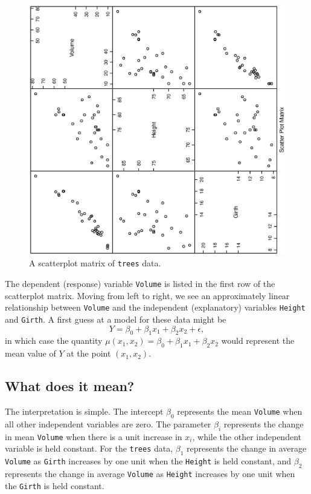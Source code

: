 \documentclass[captions=tableheading]{scrbook}
\begin{document}
\begin{example}
\begin{figure}[th]
  \includegraphics[angle=270, totalheight=4in]{ps/mlr/splom-trees.ps}
  \caption[Scatterplot matrix of \texttt{trees} data]{\small A scatterplot matrix of \texttt{trees} data.}
  \label{fig-splom-trees}
\end{figure}


The dependent (response) variable \texttt{Volume} is listed in the first row of the scatterplot matrix. Moving from left to right, we see an approximately linear relationship between \texttt{Volume} and the independent (explanatory) variables \texttt{Height} and \texttt{Girth}. A first guess at a model for these data might be
\begin{equation}
Y=\beta_{0}+\beta_{1}x_{1}+\beta_{2}x_{2}+\epsilon,
\end{equation}
in which case the quantity \(\mu(x_{1},x_{2})=\beta_{0}+\beta_{1}x_{1}+\beta_{2}x_{2}\) would represent the mean value of \(Y\) at the point \((x_{1},x_{2})\).
\end{example}
\subsection{What does it mean?}
\label{sec-12-1-1}


The interpretation is simple. The intercept \(\beta_{0}\) represents the mean \texttt{Volume} when all other independent variables are zero. The parameter \(\beta_{i}\) represents the change in mean \texttt{Volume} when there is a unit increase in \(x_{i}\), while the other independent variable is held constant. For the \texttt{trees} data, \(\beta_{1}\) represents the change in average \texttt{Volume} as \texttt{Girth} increases by one unit when the \texttt{Height} is held constant, and \(\beta_{2}\) represents the change in average \texttt{Volume} as \texttt{Height} increases by one unit when the \texttt{Girth} is held constant. 
\end{document}

